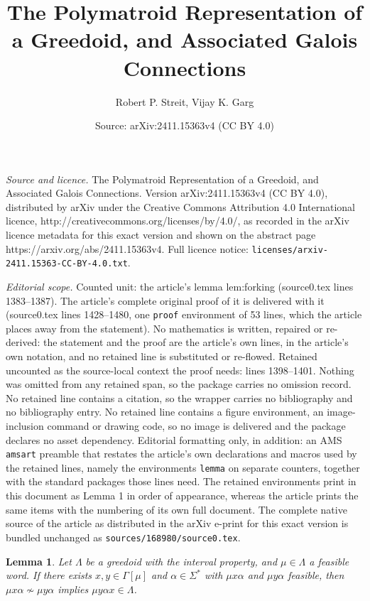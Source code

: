 \documentclass[10pt,a4paper]{amsart}
\title{The Polymatroid Representation of a Greedoid, and Associated Galois Connections}
\author{Robert P. Streit, Vijay K. Garg}
\date{Source: arXiv:2411.15363v4 (CC BY 4.0)}
\newtheorem{lemma}{Lemma}
\newcommand{\glang}{\Lambda}
\newcommand{\univ}{\Sigma}
\begin{document}
\maketitle

\noindent\emph{Source and licence.} The Polymatroid Representation of a Greedoid, and Associated Galois Connections. Version arXiv:2411.15363v4 (CC BY 4.0), distributed by arXiv under the Creative Commons Attribution 4.0 International licence, http://creativecommons.org/licenses/by/4.0/, as recorded in the arXiv licence metadata for this exact version and shown on the abstract page https://arxiv.org/abs/2411.15363v4. Full licence notice: \texttt{licenses/arxiv-2411.15363-CC-BY-4.0.txt}.\par\smallskip

\noindent\textit{Editorial scope.} Counted unit: the article's lemma lem:forking (source0.tex lines 1383--1387). The article's complete original proof of it is delivered with it (source0.tex lines 1428--1480, one \texttt{proof} environment of 53 lines, which the article places away from the statement). No mathematics is written, repaired or re-derived: the statement and the proof are the article's own lines, in the article's own notation, and no retained line is substituted or re-flowed.  Retained uncounted as the source-local context the proof needs: lines 1398--1401.  Nothing was omitted from any retained span, so the package carries no omission record.  No retained line contains a citation, so the wrapper carries no bibliography and no bibliography entry.  No retained line contains a figure environment, an image-inclusion command or drawing code, so no image is delivered and the package declares no asset dependency.  Editorial formatting only, in addition: an AMS \texttt{amsart} preamble that restates the article's own declarations and macros used by the retained lines, namely the environments \texttt{lemma} on separate counters, together with the standard packages those lines need.  The retained environments print in this document as Lemma 1 in order of appearance, whereas the article prints the same items with the numbering of its own full document.  The complete native source of the article as distributed in the arXiv e-print for this exact version is bundled unchanged as \texttt{sources/168980/source0.tex}.
\begin{lemma}\label{lem:inner-forking}
    Let $\glang$ be a greedoid with the interval property, and $\mu \in \glang$ a feasible word.
    If there exists $x,y \in \Gamma[\mu]$ and $\alpha \in \univ^*$ with $\mu x \alpha$ and $\mu y \alpha$ feasible, then $\mu x \alpha \not\sim \mu y \alpha$ implies $\mu y \alpha x \in \glang$.
\end{lemma}
\end{document}
